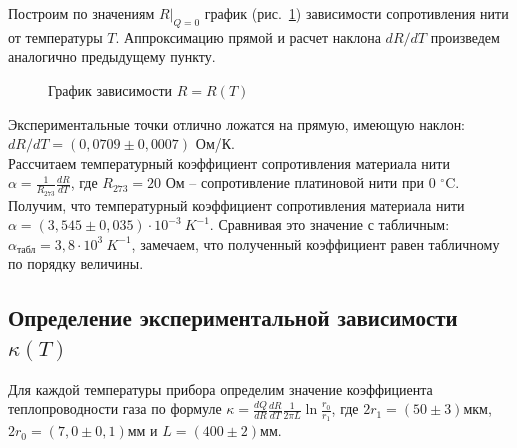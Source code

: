 \documentclass[a4paper, 12pt]{article}
\begin{document}
        \noindent Построим по значениям $R|_{Q = 0}$ график (рис.~\ref{graph:R(T)}) зависимости сопротивления нити от температуры $T$. Аппроксимацию прямой и расчет наклона $dR/dT$ произведем аналогично предыдущему пункту.
	
        \begin{figure}[H]
            \caption{График зависимости $R = R(T)$}
            \label{graph:R(T)}
        \end{figure}

        \noindent Экспериментальные точки отлично ложатся на прямую, имеющую наклон: $dR/dT = \left(0,0709 \pm 0,0007 \right)$ Ом/К. \\

        \noindent Рассчитаем температурный коэффициент сопротивления материала нити $\alpha = \frac{1}{R_{273}} \frac{dR}{dT}$, где $R_{273} = 20$ Ом -- сопротивление платиновой нити при $0$ $^\circ$C. Получим, что температурный коэффициент сопротивления материала нити $\alpha = \left( 3,545 \pm 0,035\right) \cdot 10^{-3} \: K^{-1}$. Сравнивая это значение с табличным: $\alpha_{\text{табл}} = 3,8 \cdot 10^{3} \: K^{-1}$, замечаем, что полученный коэффициент равен табличному по порядку величины. 

        \subsection*{Определение экспериментальной зависимости $\kappa (T)$}

        \noindent Для каждой температуры прибора определим значение коэффициента теплопроводности газа по формуле $\kappa = \frac{dQ}{dR} \frac{dR}{dT} \frac{1}{2\pi L} \ln \frac{r_0}{r_1}$, где $2r_1 = \left(50 \pm 3 \right) \text{мкм}$, $2r_0 = \left(7,0 \pm 0,1 \right) \text{мм}$ и $L = \left(400 \pm 2 \right) \text{мм}$. \\
        
\end{document}
